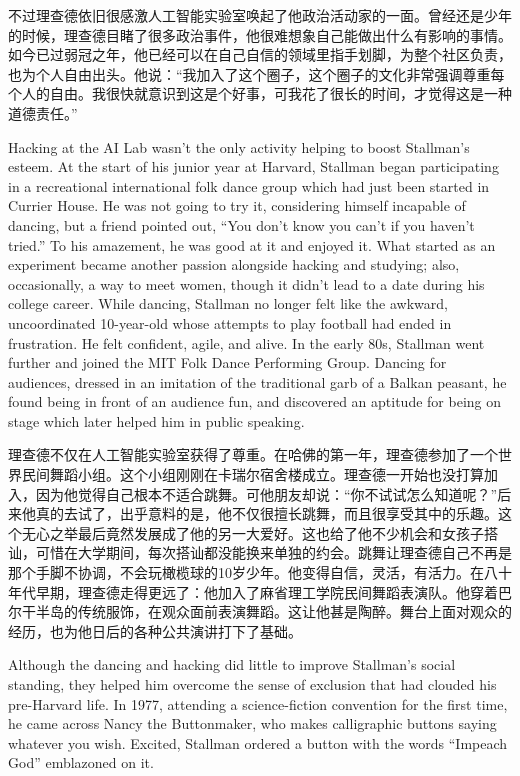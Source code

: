 \ifdefined\chs
不过理查德依旧很感激人工智能实验室唤起了他政治活动家的一面。曾经还是少年的时候，理查德目睹了很多政治事件，他很难想象自己能做出什么有影响的事情。如今已过弱冠之年，他已经可以在自己自信的领域里指手划脚，为整个社区负责，也为个人自由出头。他说：“我加入了这个圈子，这个圈子的文化非常强调尊重每个人的自由。我很快就意识到这是个好事，可我花了很长的时间，才觉得这是一种道德责任。”
\fi

\ifdefined\eng
Hacking at the AI Lab wasn't the only activity helping to boost Stallman's esteem. At the start of his junior year at Harvard, Stallman began participating in a recreational international folk dance group which had just been started in Currier House. He was not going to try it, considering himself incapable of dancing, but a friend pointed out, ``You don't know you can't if you haven't tried.'' To his amazement, he was good at it and enjoyed it. What started as an experiment became another passion alongside hacking and studying; also, occasionally, a way to meet women, though it didn't lead to a date during his college career.  While dancing, Stallman no longer felt like the awkward, uncoordinated 10-year-old whose attempts to play football had ended in frustration. He felt confident, agile, and alive. In the early 80s, Stallman went further and joined the MIT Folk Dance Performing Group.   Dancing for audiences, dressed in an imitation of the traditional garb of a Balkan peasant, he found being in front of an audience fun, and discovered an aptitude for being on stage which later helped him in public speaking.
\fi

\ifdefined\chs
理查德不仅在人工智能实验室获得了尊重。在哈佛的第一年，理查德参加了一个世界民间舞蹈小组。这个小组刚刚在卡瑞尔宿舍楼成立。理查德一开始也没打算加入，因为他觉得自己根本不适合跳舞。可他朋友却说：“你不试试怎么知道呢？”后来他真的去试了，出乎意料的是，他不仅很擅长跳舞，而且很享受其中的乐趣。这个无心之举最后竟然发展成了他的另一大爱好。这也给了他不少机会和女孩子搭讪，可惜在大学期间，每次搭讪都没能换来单独的约会。跳舞让理查德自己不再是那个手脚不协调，不会玩橄榄球的10岁少年。他变得自信，灵活，有活力。在八十年代早期，理查德走得更远了：他加入了麻省理工学院民间舞蹈表演队。他穿着巴尔干半岛的传统服饰，在观众面前表演舞蹈。这让他甚是陶醉。舞台上面对观众的经历，也为他日后的各种公共演讲打下了基础。
\fi

\ifdefined\eng
Although the dancing and hacking did little to improve Stallman's social standing, they helped him overcome the sense of exclusion that had clouded his pre-Harvard life. In 1977, attending a science-fiction convention for the first time, he came across Nancy the Buttonmaker, who makes calligraphic buttons saying whatever you wish. Excited, Stallman ordered a button with the words ``Impeach God'' emblazoned on it.
\fi

